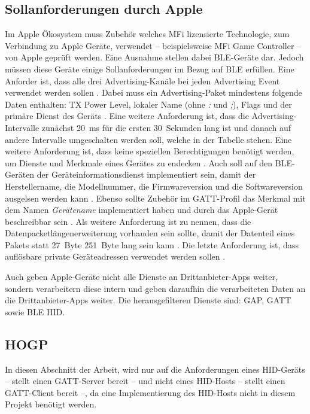 \subsection{Sollanforderungen durch Apple}
Im Apple Ökosystem muss Zubehör welches \ac{MFi} lizensierte Technologie, zum Verbindung zu Apple Geräte, verwendet -- beispielsweise \ac{MFi} Game Controller -- von Apple geprüft werden. Eine Ausnahme stellen dabei \ac{BLE}-Geräte dar. \cite{appleMfiProgram} Jedoch müssen diese Geräte einige Sollanforderungen im Bezug auf \ac{BLE} erfüllen. Eine Anforder ist, dass alle drei Advertising-Kanäle bei jeden Advertising Event verwendet werden sollen \cite[S.~186]{appleDesignGuide}. Dabei muss ein Advertising-Paket mindestens folgende Daten enthalten: TX Power Level, lokaler Name (ohne \textit{:} und \textit{;}), Flags und der primäre Dienst des Geräts \cite[S.~186f.]{appleDesignGuide}. Eine weitere Anforderung ist, dass die Advertising-Intervalle zunächst 20~ms für die ersten 30~Sekunden lang ist und danach auf andere Intervalle umgeschalten werden soll, welche in der Tabelle \cite[S.~187]{appleDesignGuide} stehen. Eine weitere Anforderung ist, dass keine speziellen Berechtigungen benötigt werden, um Dienste und Merkmale eines Gerätes zu endecken \cite[S.~190]{appleDesignGuide}. Auch soll auf den \ac{BLE}-Geräten der Geräteinformationsdienst implementiert sein, damit der Herstellername, die Modellnummer, die Firmwareversion und die Softwareversion ausgelsen werden kann \cite[S.~191]{appleDesignGuide}. Ebenso sollte Zubehör im \ac{GATT}-Profil das Merkmal mit dem Namen \textit{Gerätename} implementiert haben und durch das Apple-Gerät beschreibbar sein \cite[S.~190]{appleDesignGuide}. Als weitere Anforderung ist zu nennen, dass die Datenpacketlängenerweiterung vorhanden sein sollte, damit der Datenteil eines Pakets statt 27~Byte 251~Byte lang sein kann \cite[S.~189]{appleDesignGuide}. Die letzte Anforderung ist, dass auflösbare private Geräteadressen verwendet werden sollen \cite[S.~189]{appleDesignGuide}.

Auch geben Apple-Geräte nicht alle Dienste an Drittanbieter-Apps weiter, sondern verarbeitern diese intern und geben daraufhin die verarbeiteten Daten an die Drittanbieter-Apps weiter. Die herausgefilteren Dienste sind: \ac{GAP}, \ac{GATT} sowie \ac{BLE} \ac{HID}. \cite[S.~192]{appleDesignGuide}

\subsection{\acf{HOGP}}
In diesen Abschnitt der Arbeit, wird nur auf die Anforderungen eines \acs{HID}-Geräts -- stellt einen \acs{GATT}-Server bereit \cite[S.~9]{bluetoothHOGP} -- und nicht eines \acs{HID}-Hosts -- stellt einen \acs{GATT}-Client bereit \cite[S.~9]{bluetoothHOGP} --, da eine Implementierung des \acs{HID}-Hosts nicht in diesem Projekt benötigt werden.

